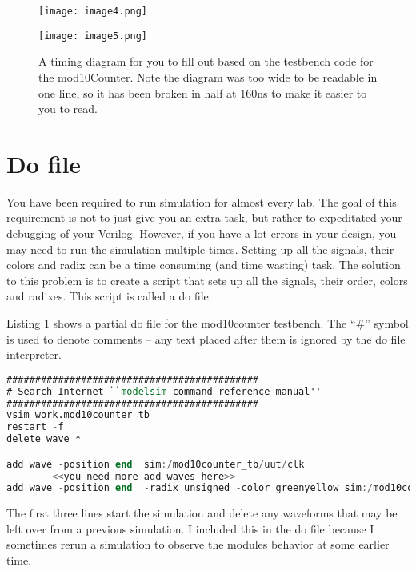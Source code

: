 \begin{landscape}
\begin{figure}
\texttt{[image: image4.png]}

\texttt{[image: image5.png]}

\caption{A timing diagram for you to fill out based on the testbench
code for the mod10Counter. Note the diagram was too wide to be readable
in one line, so it has been broken in half at 160ns to make it easier to
you to read.}
\label{fig:mod10TimingDiamgram}
\end{figure}
\end{landscape}

\section{Do file}

You have been required to run simulation for almost every lab. The goal
of this requirement is not to just give you an extra task, but rather to
expeditated your debugging of your Verilog. However, if you have a lot
errors in your design, you may need to run the simulation multiple
times. Setting up all the signals, their colors and radix can be a time
consuming (and time wasting) task. The solution to this problem is to
create a script that sets up all the signals, their order, colors and
radixes. This script is called a do file.

Listing 1 shows a partial do file for the mod10counter testbench. The
``\#'' symbol is used to denote comments -- any text placed after them
is ignored by the do file interpreter.


\begin{lstlisting}[language=Verilog,
 caption={A partial do file for the mod10counter.},
basicstyle=\tiny\ttfamily,
 label={listing:hiLowWinVerilog},
 frame=single]
############################################
# Search Internet ``modelsim command reference manual''
############################################
vsim work.mod10counter_tb
restart -f
delete wave *

add wave -position end  sim:/mod10counter_tb/uut/clk
		<<you need more add waves here>>
add wave -position end  -radix unsigned -color greenyellow sim:/mod10counter_tb/uut/currentCount
 \end{lstlisting}
 
The first three lines start the simulation and delete any waveforms that
may be left over from a previous simulation. I included this in the do
file because I sometimes rerun a simulation to observe the modules
behavior at some earlier time.

